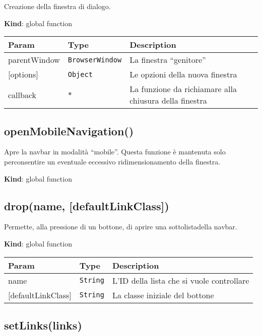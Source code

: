 Creazione della finestra di dialogo.

\textbf{Kind}: global function

\begin{longtabu} to \textwidth {X[1,L,m]X[1,L,m]X[1.5,L,m]}
\toprule
Param & Type & Description\tabularnewline
\midrule
\endhead
parentWindow & \texttt{BrowserWindow} & La finestra
``genitore''\tabularnewline
{[}options{]} & \texttt{Object} & Le opzioni della nuova
finestra\tabularnewline
callback & \texttt{*} & La funzione da richiamare alla chiusura della
finestra\tabularnewline
\bottomrule
\end{longtabu}

\protect\hypertarget{openMobileNavigation}{}{}

\hypertarget{openmobilenavigation}{%
\subsection{openMobileNavigation()}\label{openmobilenavigation}}

Apre la navbar in modalità ``mobile''. Questa funzione è mantenuta solo
perconsentire un eventuale eccessivo ridimensionamento della finestra.

\textbf{Kind}: global function\\
\protect\hypertarget{drop}{}{}

\hypertarget{dropname-defaultlinkclass}{%
\subsection{drop(name,
{[}defaultLinkClass{]})}\label{dropname-defaultlinkclass}}

Permette, alla pressione di un bottone, di aprire una sottolistadella
navbar.

\textbf{Kind}: global function

\begin{longtabu} to \textwidth {X[1,L,m]X[1,L,m]X[1.5,L,m]}
\toprule
Param & Type & Description\tabularnewline
\midrule
\endhead
name & \texttt{String} & L'ID della lista che si vuole
controllare\tabularnewline
{[}defaultLinkClass{]} & \texttt{String} & La classe iniziale del
bottone\tabularnewline
\bottomrule
\end{longtabu}

\protect\hypertarget{setLinks}{}{}

\hypertarget{setlinkslinks}{%
\subsection{setLinks(links)}\label{setlinkslinks}}

